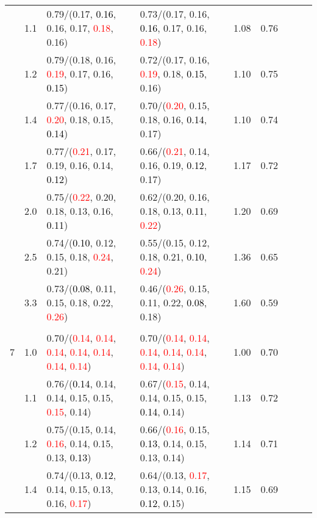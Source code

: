 \documentclass[10pt,a4paper]{report}
\begin{document}
\begin{table}[!htbp]
\begin{center}
{\begin{tabular}{ccllccccc}
			&1.1&0.79/(0.17, \textcolor{black}{0.16}, 0.16, 0.17, \textcolor{red}{0.18}, 0.16)&0.73/(0.17, 0.16, \textcolor{black}{0.16}, 0.17, 0.16, \textcolor{red}{0.18})&1.08&0.76\\
			&1.2&0.79/(0.18, 0.16, \textcolor{red}{0.19}, 0.17, 0.16, \textcolor{black}{0.15})&0.72/(0.17, 0.16, \textcolor{red}{0.19}, 0.18, \textcolor{black}{0.15}, 0.16)&1.10&0.75\\
			&1.4&0.77/(0.16, 0.17, \textcolor{red}{0.20}, 0.18, 0.15, \textcolor{black}{0.14})&0.70/(\textcolor{red}{0.20}, 0.15, 0.18, 0.16, \textcolor{black}{0.14}, 0.17)&1.10&0.74\\
			&1.7&0.77/(\textcolor{red}{0.21}, 0.17, 0.19, 0.16, 0.14, \textcolor{black}{0.12})&0.66/(\textcolor{red}{0.21}, 0.14, 0.16, 0.19, \textcolor{black}{0.12}, 0.17)&1.17&0.72\\
			&2.0&0.75/(\textcolor{red}{0.22}, 0.20, 0.18, 0.13, 0.16, \textcolor{black}{0.11})&0.62/(0.20, 0.16, 0.18, 0.13, \textcolor{black}{0.11}, \textcolor{red}{0.22})&1.20&0.69\\
			&2.5&0.74/(\textcolor{black}{0.10}, 0.12, 0.15, 0.18, \textcolor{red}{0.24}, 0.21)&0.55/(0.15, 0.12, 0.18, 0.21, \textcolor{black}{0.10}, \textcolor{red}{0.24})&1.36&0.65\\
			&3.3&0.73/(\textcolor{black}{0.08}, 0.11, 0.15, 0.18, 0.22, \textcolor{red}{0.26})&0.46/(\textcolor{red}{0.26}, 0.15, 0.11, 0.22, \textcolor{black}{0.08}, 0.18)&1.60&0.59\\
			&&&&\\
			7			&1.0&0.70/(\textcolor{red}{0.14}, \textcolor{red}{0.14}, \textcolor{red}{0.14}, \textcolor{red}{0.14}, \textcolor{red}{0.14}, \textcolor{red}{0.14}, \textcolor{red}{0.14})&0.70/(\textcolor{red}{0.14}, \textcolor{red}{0.14}, \textcolor{red}{0.14}, \textcolor{red}{0.14}, \textcolor{red}{0.14}, \textcolor{red}{0.14}, \textcolor{red}{0.14})&1.00&0.70\\
			&1.1&0.76/(\textcolor{black}{0.14}, 0.14, 0.14, 0.15, 0.15, \textcolor{red}{0.15}, 0.14)&0.67/(\textcolor{red}{0.15}, 0.14, 0.14, 0.15, 0.15, \textcolor{black}{0.14}, 0.14)&1.13&0.72\\
			&1.2&0.75/(0.15, 0.14, \textcolor{red}{0.16}, 0.14, 0.15, 0.13, \textcolor{black}{0.13})&0.66/(\textcolor{red}{0.16}, 0.15, \textcolor{black}{0.13}, 0.14, 0.15, 0.13, 0.14)&1.14&0.71\\
			&1.4&0.74/(0.13, \textcolor{black}{0.12}, 0.14, 0.15, 0.13, 0.16, \textcolor{red}{0.17})&0.64/(0.13, \textcolor{red}{0.17}, 0.13, 0.14, 0.16, \textcolor{black}{0.12}, 0.15)&1.15&0.69\\

\end{tabular}}
\end{center}
\end{table}
\end{document}
